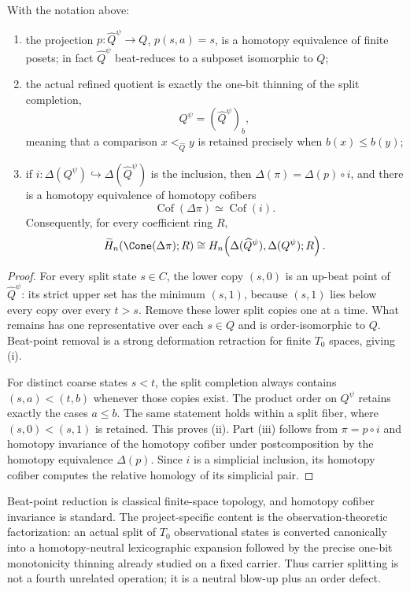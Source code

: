 \begin{theorem}\label{thm:split-factorization}
With the notation above:
\begin{enumerate}[label=(\roman*)]
\item the projection $p:\widehat Q^\psi\to Q$, $p(s,a)=s$, is a homotopy
  equivalence of finite posets; in fact $\widehat Q^\psi$ beat-reduces to a
  subposet isomorphic to $Q$;
\item the actual refined quotient is exactly the one-bit thinning of the split
  completion,
  \[
    Q^\psi=(\widehat Q^\psi)_b,
  \]
  meaning that a comparison $x<_{\widehat Q}y$ is retained precisely when
  $b(x)\leq b(y)$;
\item if $i:\Delta(Q^\psi)\hookrightarrow\Delta(\widehat Q^\psi)$ is the
  inclusion, then $\Delta(\pi)=\Delta(p)\circ i$, and there is a homotopy
  equivalence of homotopy cofibers
  \[
  \operatorname{Cof}(\Delta\pi)\simeq
  \operatorname{Cof}(i).
  \]
  Consequently, for every coefficient ring $R$,
  \[
  \widetilde H_n\!\left(\Cone(\Delta\pi);R\right)
  \cong
  H_n\!\left(\Delta(\widehat Q^\psi),\Delta(Q^\psi);R\right).
  \]
\end{enumerate}
\end{theorem}

\begin{proof}
For every split state $s\in C$, the lower copy $(s,0)$ is an up-beat point of
$\widehat Q^\psi$: its strict upper set has the minimum $(s,1)$, because
$(s,1)$ lies below every copy over every $t>s$.  Remove these lower split
copies one at a time.  What remains has one representative over each $s\in Q$
and is order-isomorphic to $Q$.  Beat-point removal is a strong deformation
retraction for finite $T_0$ spaces, giving (i).

For distinct coarse states $s<t$, the split completion always contains
$(s,a)<(t,b)$ whenever those copies exist.  The product order on $Q^\psi$
retains exactly the cases $a\leq b$.  The same statement holds within a split
fiber, where $(s,0)<(s,1)$ is retained.  This proves (ii).  Part (iii) follows
from $\pi=p\circ i$ and homotopy invariance of the homotopy cofiber under
postcomposition by the homotopy equivalence $\Delta(p)$.  Since $i$ is a
simplicial inclusion, its homotopy cofiber computes the relative homology of
its simplicial pair.
\end{proof}

\begin{remark}
Beat-point reduction is classical finite-space topology, and homotopy cofiber
invariance is standard.  The project-specific content is the observation-theoretic
factorization: an actual split of $T_0$ observational states is converted canonically
into a homotopy-neutral lexicographic expansion followed by the precise one-bit
monotonicity thinning already studied on a fixed carrier.  Thus carrier splitting
is not a fourth unrelated operation; it is a neutral blow-up plus an order defect.
\end{remark}

